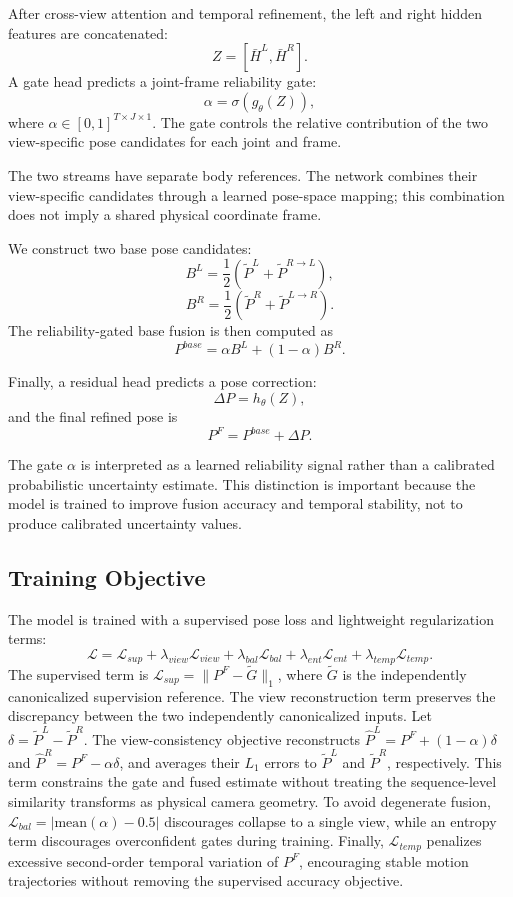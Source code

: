 \documentclass[preprint,12pt]{elsarticle}
\begin{document}
After cross-view attention and temporal refinement, the left and right hidden features are concatenated:
\[
Z = [\bar{H}^{L}, \bar{H}^{R}].
\]
A gate head predicts a joint-frame reliability gate:
\[
\alpha = \sigma(g_{\theta}(Z)),
\]
where \(\alpha \in [0,1]^{T \times J \times 1}\). The gate controls the relative contribution of the two view-specific pose candidates for each joint and frame.

The two streams have separate body references. The network combines their view-specific candidates through a learned pose-space mapping; this combination does not imply a shared physical coordinate frame.

We construct two base pose candidates:
\[
B^{L} = \frac{1}{2}(\tilde{P}^{L} + \tilde{P}^{R \rightarrow L}),
\]
\[
B^{R} = \frac{1}{2}(\tilde{P}^{R} + \tilde{P}^{L \rightarrow R}).
\]
The reliability-gated base fusion is then computed as
\[
P^{base}
=
\alpha B^{L}
+
(1-\alpha)B^{R}.
\]

Finally, a residual head predicts a pose correction:
\[
\Delta P = h_{\theta}(Z),
\]
and the final refined pose is
\[
P^{F} = P^{base} + \Delta P.
\]

The gate \(\alpha\) is interpreted as a learned reliability signal rather than a calibrated probabilistic uncertainty estimate. This distinction is important because the model is trained to improve fusion accuracy and temporal stability, not to produce calibrated uncertainty values.

\subsection{Training Objective}
\label{subsec:training_objective}

The model is trained with a supervised pose loss and lightweight regularization terms:
\[
\mathcal{L}
=
\mathcal{L}_{sup}
+
\lambda_{view}\mathcal{L}_{view}
+
\lambda_{bal}\mathcal{L}_{bal}
+
\lambda_{ent}\mathcal{L}_{ent}
+
\lambda_{temp}\mathcal{L}_{temp}.
\]
The supervised term is \(\mathcal{L}_{sup}=\|P^F-\tilde{G}\|_1\), where \(\tilde{G}\) is the independently canonicalized supervision reference. The view reconstruction term preserves the discrepancy between the two independently canonicalized inputs. Let \(\delta=\tilde{P}^{L}-\tilde{P}^{R}\). The view-consistency objective reconstructs \(\hat{P}^{L}=P^{F}+(1-\alpha)\delta\) and \(\hat{P}^{R}=P^{F}-\alpha\delta\), and averages their \(L_1\) errors to \(\tilde{P}^{L}\) and \(\tilde{P}^{R}\), respectively. This term constrains the gate and fused estimate without treating the sequence-level similarity transforms as physical camera geometry. To avoid degenerate fusion, \(\mathcal{L}_{bal}=|\mathrm{mean}(\alpha)-0.5|\) discourages collapse to a single view, while an entropy term discourages overconfident gates during training. Finally, \(\mathcal{L}_{temp}\) penalizes excessive second-order temporal variation of \(P^{F}\), encouraging stable motion trajectories without removing the supervised accuracy objective.
\end{document}
